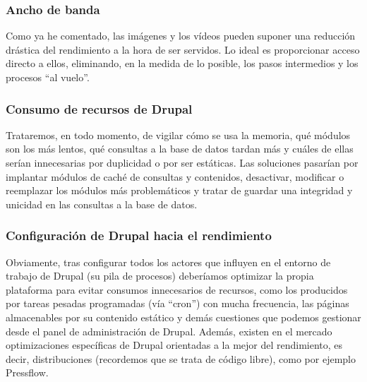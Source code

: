\subsubsection{Ancho de banda}
\par Como ya he comentado, las imágenes y los vídeos pueden suponer una reducción drástica del rendimiento a la hora de ser servidos. Lo ideal es proporcionar acceso directo a ellos, eliminando, en la medida de lo posible, los pasos intermedios y los procesos ``al vuelo''.

\subsubsection{Consumo de recursos de Drupal}
\par Trataremos, en todo momento, de vigilar cómo se usa la memoria, qué módulos son los más lentos, qué consultas a la base de datos tardan más y cuáles de ellas serían innecesarias por duplicidad o por ser estáticas. Las soluciones pasarían por implantar módulos de caché de consultas y contenidos, desactivar, modificar o reemplazar los módulos más problemáticos y tratar de guardar una integridad y unicidad en las consultas a la base de datos.

\subsubsection{Configuración de Drupal hacia el rendimiento}
\par Obviamente, tras configurar todos los actores que influyen en el entorno de trabajo de Drupal (su pila de procesos) deberíamos optimizar la propia plataforma para evitar consumos innecesarios de recursos, como los producidos por tareas pesadas programadas (vía ``cron'') con mucha frecuencia, las páginas almacenables por su contenido estático y demás cuestiones que podemos gestionar desde el panel de administración de Drupal. Además, existen en el mercado optimizaciones específicas de Drupal orientadas a la mejor del rendimiento, es decir, distribuciones (recordemos que se trata de código libre), como por ejemplo Pressflow\cite{references:drupalpressflow}.

